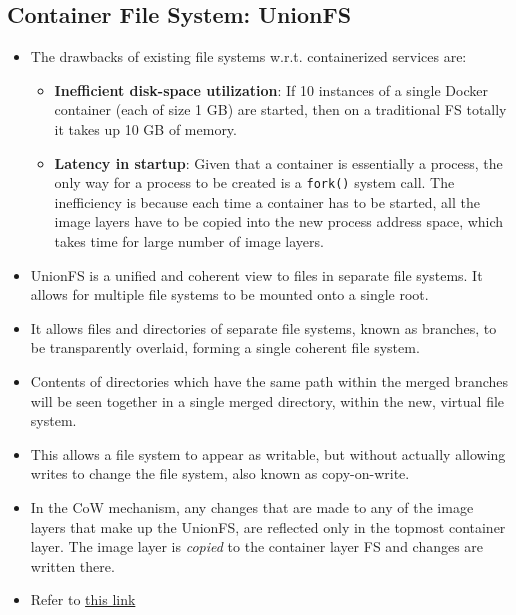 \documentclass{article}
\begin{document}
\subsection{Container File System: UnionFS}
\begin{itemize}
    \item The drawbacks of existing file systems w.r.t. containerized services are:
    \begin{itemize}
        \item \textbf{Inefficient disk-space utilization}: If 10 instances of a single Docker container (each of size 1 GB) are started, then on a traditional FS totally it takes up 10 GB of memory.
        
        \item \textbf{Latency in startup}: Given that a container is essentially a process, the only way for a process to be created is a \texttt{fork()} system call. The inefficiency is because each time a container has to be started, all the image layers have to be copied into the new process address space, which takes time for large number of image layers.
    \end{itemize}
    
    \item UnionFS is a unified and coherent view to files in separate file systems. It allows for multiple file systems to be mounted onto a single root. 
    
    \item It allows files and directories of separate file systems, known as branches, to be transparently overlaid, forming a single coherent file system.
    
    \item Contents of directories which have the same path within the merged branches will be seen together in a single merged directory, within the new, virtual file system.

    \item This allows a file system to appear as writable, but without actually allowing writes to change the file system, also known as copy-on-write. 
    
    \item In the CoW mechanism, any changes that are made to any of the image layers that make up the UnionFS, are reflected only in the topmost container layer. The image layer is \textit{copied} to the container layer FS and changes are written there. 
    
    \item Refer to \href{https://medium.com/@paccattam/drooling-over-docker-2-understanding-union-file-systems-2e9bf204177c}{this link}
\end{itemize}
\end{document}
